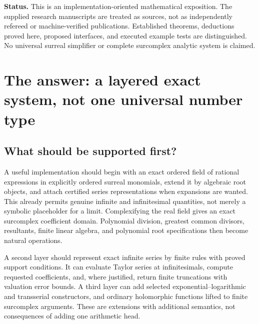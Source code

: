 \documentclass[11pt,letterpaper]{article}
\numberwithin{equation}{section}
\theoremstyle{definition}
\theoremstyle{remark}\newtheorem{remark}[theorem]{Remark}
\begin{document}
\begin{titlepage}
\begin{minipage}{0.93\textwidth}
\begin{abstract}
The three supplied manuscripts determine the meaning of Hahn coherence,
strong summability, and the distinction between fine-local and all-scale
functions. The proposed software architecture preserves those distinctions,
including the nonuniqueness of a global surcomplex exponential at infinite
imaginary arguments. Wolfram Language facilities are assessed against current
official documentation. A small, separately delimited Wolfram Language prototype
and reproducible tests demonstrate exact sparse arithmetic; they do not purport
to implement the entire architecture.
\end{abstract}
\end{minipage}
\vfill
\begin{minipage}{0.93\textwidth}\small
\textbf{Status.} This is an implementation-oriented mathematical exposition.
The supplied research manuscripts are treated as sources, not as independently
refereed or machine-verified publications. Established theorems, deductions
proved here, proposed interfaces, and executed example tests are distinguished.
No universal surreal simplifier or complete surcomplex analytic system is claimed.
\end{minipage}
\end{titlepage}
\hypersetup{pageanchor=true}
\tableofcontents
\clearpage{}

\section{The answer: a layered exact system, not one universal number type}
\label{sec:answer}

\subsection{What should be supported first?}
A useful implementation should begin with an exact ordered field of rational
expressions in explicitly ordered surreal monomials, extend it by algebraic
root objects, and attach certified series representations when expansions are
wanted. This already permits genuine infinite and infinitesimal quantities,
not merely a symbolic placeholder for a limit. Complexifying the real field
gives an exact surcomplex coefficient domain. Polynomial division, greatest
common divisors, resultants, finite linear algebra, and polynomial root
specifications then become natural operations.

A second layer should represent exact infinite series by finite rules with
proved support conditions. It can evaluate Taylor series at infinitesimals,
compute requested coefficients, and, where justified, return finite
truncations with valuation error bounds. A third layer can add selected
exponential--logarithmic and transserial constructors, and ordinary holomorphic
functions lifted to finite surcomplex arguments. These are extensions with
additional semantics, not consequences of adding one arithmetic head.
\end{document}
